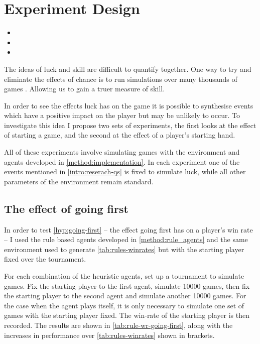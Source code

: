 \documentclass[../main.tex]{subfiles}
\begin{document}
\section{Experiment Design} \label{method:experiments}
\begin{itemize}[nosep]
    \item {}
    \item {}
    \item {}
\end{itemize}


The ideas of luck and skill are difficult to quantify together. One way to try and eliminate the effects of chance is to run simulations over many thousands of games \cite{guo_distinguishing_2019}. Allowing us to gain a truer measure of skill. 

In order to see the effects luck has on the game it is possible to synthesise events which have a positive impact on the player but may be unlikely to occur. To investigate this idea I propose two sets of experiments, the first looks at the effect of starting a game, and the second at the effect of a player's starting hand.


All of these experiments involve simulating games with the environment and agents developed in \cref{method:implementation}. In each experiment one of the events mentioned in \cref{intro:reserach-qs} is fixed to simulate luck, while all other parameters of the environment remain standard. 

\subsection{The effect of going first} \label{method:going-first}
In order to test \cref{hyp:going-first} -- the effect going first has on a player's win rate -- I used the rule based agents developed in \autoref{method:rule_agents} and the same environment used to generate \autoref{tab:rules-winrates} but with the starting player fixed over the tournament.

For each combination of the heuristic agents, set up a tournament to simulate games. Fix the starting player to the first agent, simulate 10000 games, then fix the starting player to the second agent and simulate another 10000 games. For the case when the agent plays itself, it is only necessary to simulate one set of games with the starting player fixed. The win-rate of the starting player is then recorded. The results are shown in \autoref{tab:rule-wr-going-first}, along with the increases in performance over \autoref{tab:rules-winrates} shown in brackets.
\end{document}
